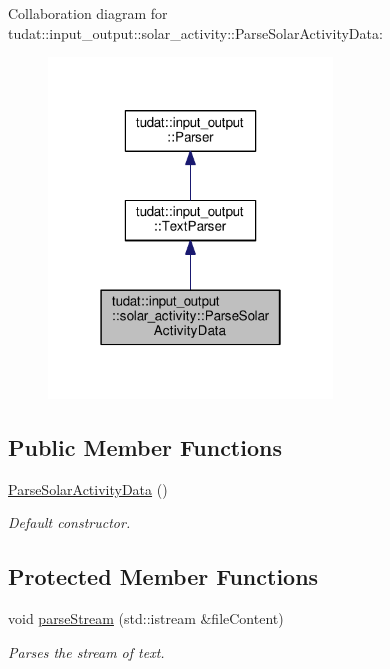 Collaboration diagram for tudat\+:\+:input\+\_\+output\+:\+:solar\+\_\+activity\+:\+:Parse\+Solar\+Activity\+Data\+:
\nopagebreak
\begin{figure}[H]
\begin{center}
\leavevmode
\includegraphics[width=214pt]{classtudat_1_1input__output_1_1solar__activity_1_1ParseSolarActivityData__coll__graph}
\end{center}
\end{figure}
\subsection*{Public Member Functions}
\begin{DoxyCompactItemize}
\item 
\hyperlink{classtudat_1_1input__output_1_1solar__activity_1_1ParseSolarActivityData_a72431fb21b52e9eaa0ff2f2b86755f6d}{Parse\+Solar\+Activity\+Data} ()
\begin{DoxyCompactList}\small\item\em Default constructor. \end{DoxyCompactList}\end{DoxyCompactItemize}
\subsection*{Protected Member Functions}
\begin{DoxyCompactItemize}
\item 
void \hyperlink{classtudat_1_1input__output_1_1solar__activity_1_1ParseSolarActivityData_a8f56e590afa7f4de81e729f308509d37}{parse\+Stream} (std\+::istream \&file\+Content)
\begin{DoxyCompactList}\small\item\em Parses the stream of text. \end{DoxyCompactList}\end{DoxyCompactItemize}
